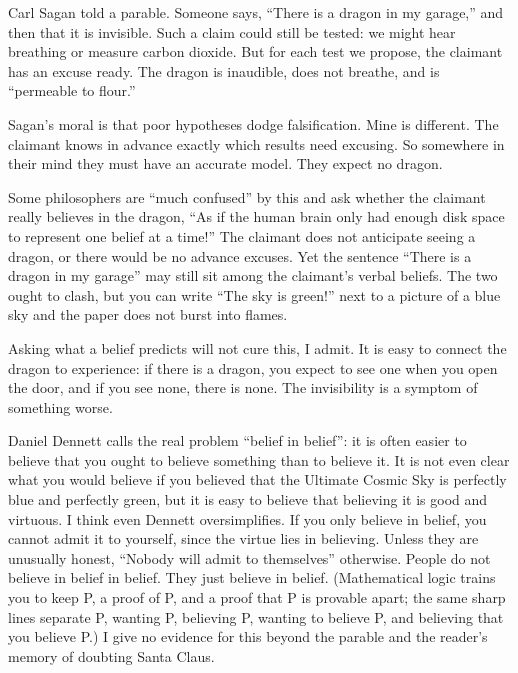 
Carl Sagan told a parable. Someone says, ``There is a dragon in my garage,'' and then that it is invisible. Such a claim could still be tested: we might hear breathing or measure carbon dioxide. But for each test we propose, the claimant has an excuse ready. The dragon is inaudible, does not breathe, and is ``permeable to flour.''

Sagan's moral is that poor hypotheses dodge falsification. Mine is different. The claimant knows in advance exactly which results need excusing. So somewhere in their mind they must have an accurate model. They expect no dragon. 

Some philosophers are ``much confused'' by this and ask whether the claimant really believes in the dragon, ``As if the human brain only had enough disk space to represent one belief at a time!'' The claimant does not anticipate seeing a dragon, or there would be no advance excuses. Yet the sentence ``There is a dragon in my garage'' may still sit among the claimant's verbal beliefs. The two ought to clash, but you can write ``The sky is green!'' next to a picture of a blue sky and the paper does not burst into flames. 

Asking what a belief predicts will not cure this, I admit. It is easy to connect the dragon to experience: if there is a dragon, you expect to see one when you open the door, and if you see none, there is none. The invisibility is a symptom of something worse.

Daniel Dennett calls the real problem ``belief in belief'': it is often easier to believe that you ought to believe something than to believe it. It is not even clear what you would believe if you believed that the Ultimate Cosmic Sky is perfectly blue and perfectly green, but it is easy to believe that believing it is good and virtuous. I think even Dennett oversimplifies. If you only believe in belief, you cannot admit it to yourself, since the virtue lies in believing. Unless they are unusually honest, ``Nobody will admit to themselves'' otherwise. People do not believe in belief in belief. They just believe in belief. (Mathematical logic trains you to keep P, a proof of P, and a proof that P is provable apart; the same sharp lines separate P, wanting P, believing P, wanting to believe P, and believing that you believe P.) I give no evidence for this beyond the parable and the reader's memory of doubting Santa Claus.

